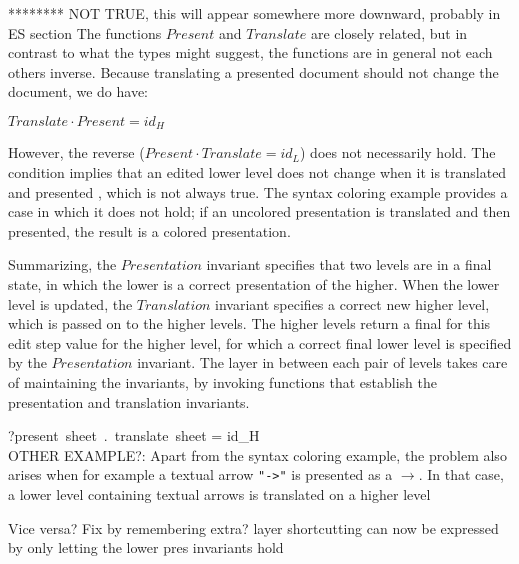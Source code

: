 \bc
{}
******** NOT TRUE, this will appear somewhere more downward, probably in ES section
The functions $Present$ and $Translate$ are closely related, but in contrast to what the types might suggest, the functions are in general not each others inverse. Because translating a presented document should not change the document, we do have: 

\begin{small}\begin{math}
Translate \cdot Present = id_{H}
\end{math}\end{small}


However, the reverse ($Present \cdot Translate = id_{L}$) does not necessarily hold. The condition implies that an edited lower level does not change when it is translated and presented , which is not always true. The syntax coloring example provides a case in which it does not hold; if an uncolored presentation is translated and then presented, the result is a colored presentation. 
\ec

Summarizing, the $Presentation$ invariant specifies that two levels are in a final state, in which the lower is a correct presentation of the higher. When the lower level is updated, the $Translation$ invariant specifies a correct new higher level, which is passed on to the higher levels. The higher levels return a final for this edit step value for the higher level, for which a correct final lower level is specified by the $Presentation$ invariant. The layer in between each pair of levels takes care of maintaining the invariants, by invoking functions that establish the presentation and translation invariants.


\bc
?present~sheet~.~translate~sheet = id_{H}\\

OTHER EXAMPLE?: Apart from the syntax coloring example, the problem also arises when for example a textual arrow 
\verb|"->"| is presented as a $\rightarrow$. In that case, a lower level containing textual arrows is 
translated on a higher level 

Vice versa? Fix by remembering extra?
 layer shortcutting can now be expressed by only letting the lower pres invariants hold

